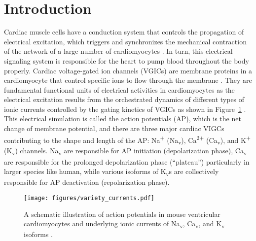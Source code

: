 \documentclass[utf8]{frontiersHLTH} %
\begin{document}
\section{Introduction}
Cardiac muscle cells have a conduction system that controls the propagation of electrical excitation, which triggers and synchronizes the mechanical contraction of the network of a large number of cardiomyocytes \cite{veeraraghavan2014mechanisms}. In turn, this electrical signaling system is responsible for the heart to pump blood throughout the body properly. Cardiac voltage-gated ion channels (VGICs) are membrane proteins in a cardiomyocyte that control specific ions to flow through the membrane \cite{bezanilla2005vgic}. They are fundamental functional units of electrical activities in cardiomyocytes as the electrical excitation results from the orchestrated dynamics of different types of ionic currents controlled by the gating kinetics of VGICs as shown in Figure~\ref{fig:variety_ionc} \cite{grant2009cardiac}. This electrical simulation is called the action potentials (AP), which is the net change of membrane potential, and there are three major cardiac VIGCs contributing to the shape and length of the AP: Na\textsuperscript{+}  (Na\textsubscript{v}), Ca\textsuperscript{2+}  (Ca\textsubscript{v}), and K\textsuperscript{+}  (K\textsubscript{v}) channels. Na\textsubscript{v} are responsible for AP initiation (depolarization phase), Ca\textsubscript{v} are responsible for the prolonged depolarization phase (``plateau'') particularly in larger species like human, while various isoforms of K\textsubscript{v}s are collectively responsible for AP deactivation (repolarization phase). 
\begin{figure}[!ht]
    \centering
    \texttt{[image: figures/variety\_currents.pdf]}
    \caption{A schematic illustration of action potentials in mouse ventricular cardiomyocytes and underlying ionic currents of Na\textsubscript{v}, Ca\textsubscript{v}, and K\textsubscript{v} isoforms \cite{nerbonne2003molecular}.}
    \label{fig:variety_ionc}
\end{figure}
\end{document}
